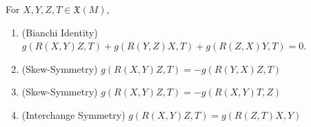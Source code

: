 \begin{proposition}\label{prop:symmetries of curvature tensor}
	For $X,Y,Z,T \in \mathfrak{X}(M)$,
	\begin{enumerate}
		\item \label{it:curvature symmetries 4}(Bianchi Identity) $g(R(X,Y)Z,T) + g(R(Y,Z)X,T) + g(R(Z,X)Y,T) = 0$.
		\item \label{it:curvature symmetries 1}(Skew-Symmetry) $g(R(X,Y)Z,T) = -g(R(Y,X)Z,T)$
		\item \label{it:curvature symmetries 2}(Skew-Symmetry) $g(R(X,Y)Z,T) = -g(R(X,Y)T,Z)$
		\item \label{it:curvature symmetries 3}(Interchange Symmetry) $g(R(X,Y)Z,T) = g(R(Z,T)X,Y)$
	\end{enumerate}
\end{proposition}

